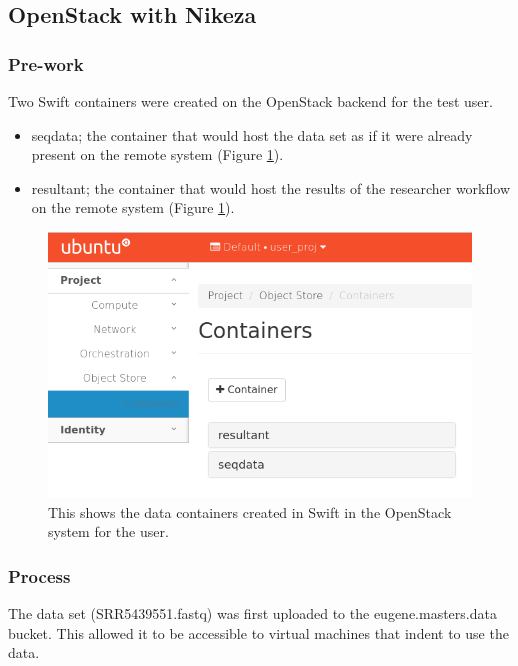 \subsection{OpenStack with Nikeza}

\subsubsection{Pre-work}

Two Swift containers were created on the OpenStack backend for the test user.

\begin{itemize}
    \item seqdata; the container that would host the data set as if it were already present on the remote system (Figure \ref{fig:swift_prep}).
    \item resultant; the container that would host the results of the researcher workflow on the remote system (Figure \ref{fig:swift_prep}).
\end{itemize}

\begin{figure}[h!]
\centering
\includegraphics[width=\textwidth]{Figures/4_os_swift_prep.png}
\decoRule
\caption[OpenStack Swift Containers for Testing]{This shows the data containers created in Swift in the OpenStack system for the user.}
\label{fig:swift_prep}
\end{figure}

\subsubsection{Process}

The data set (SRR5439551.fastq) was first uploaded to the eugene.masters.data bucket. This allowed it to be accessible to virtual machines that indent to use the data.

